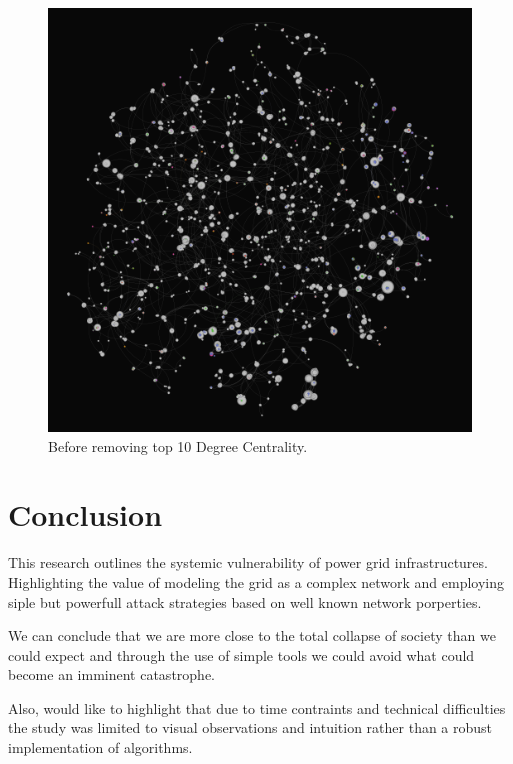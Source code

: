 \documentclass[10pt,twocolumn,letterpaper]{article}
\begin{document}
\begin{figure}[t]
    \centering
    \includegraphics[width=0.8\linewidth]{images/Degree_power.png}
    \caption{Before removing top 10 Degree Centrality.}
    \label{fig:onecol}
\end{figure}

\section{Conclusion}

This research outlines the systemic vulnerability of power grid infrastructures. Highlighting the value of modeling the grid as a complex network and employing siple but powerfull attack strategies based on well known network porperties.

We can conclude that we are more close to the total collapse of society than we could expect and through the use of simple tools we could avoid what could become an imminent catastrophe.

Also, would like to highlight that due to time contraints and technical difficulties the study was limited to visual observations and intuition rather than a robust implementation of algorithms.



{\small


}
\end{document}
